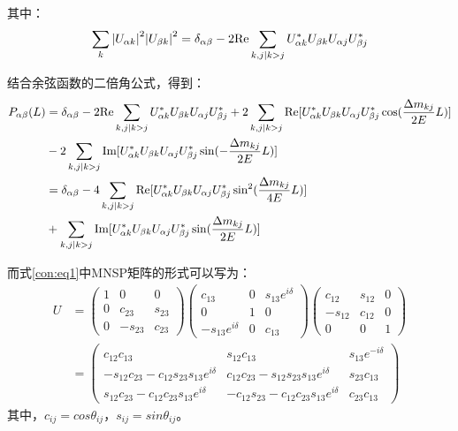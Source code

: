 \documentclass[10pt,a4paper]{article}
\begin{document}
其中：\begin{equation}
\label{con:eq17}
\sum_{k}{|U_{\alpha k}|}^{2}{|U_{\beta k}|}^{2}=\delta_{\alpha\beta}-2{\rm Re}\sum_{k,j |k>j}U_{\alpha k}^{*}U_{\beta k}U_{\alpha j}U_{\beta j}^{*}
\end{equation}


结合余弦函数的二倍角公式，得到：
\begin{equation}
\label{con:eq18}
\begin{split}
P_{\alpha\beta}(L)&=\delta_{\alpha\beta}-2{\rm Re}\sum_{k,j |k>j}U_{\alpha k}^{*}U_{\beta k}U_{\alpha j}U_{\beta j}^{*}+2\sum_{k,j |k>j}{\rm Re}[U_{\alpha k}^{*}U_{\beta k}U_{\alpha j}U_{\beta j}^{*}\cos(\frac{\Delta m_{kj}}{2E}L)]\\&-2\sum_{k,j |k>j}{\rm Im}[U_{\alpha k}^{*}U_{\beta k}U_{\alpha j}U_{\beta j}^{*}\sin(-\frac{\Delta m_{kj}}{2E}L)]
\\
&=\delta_{\alpha\beta}-4\sum_{k,j |k>j}{\rm Re}[U_{\alpha k}^{*}U_{\beta k}U_{\alpha j}U_{\beta j}^{*}\sin^2(\frac{\Delta m_{kj}}{4E}L)]
\\&+\sum_{k,j |k>j}{\rm Im}[U_{\alpha k}^{*}U_{\beta k}U_{\alpha j}U_{\beta j}^{*}\sin(\frac{\Delta m_{kj}}{2E}L)]
\end{split}
\end{equation}


而式\eqref{con:eq1}中MNSP矩阵的形式可以写为：
\begin{equation}
\label{con:eq19}
\begin{aligned}
U &= \begin{pmatrix}
 1 & 0 & 0 \\
 0 & c_{23} & s_{23} \\
 0 & -s_{23} & c_{23}
 \end{pmatrix}
 \begin{pmatrix}
 c_{13} & 0 & s_{13}e^{i\delta} \\
 0 & 1 & 0 \\
 -s_{13}e^{i\delta} & 0 & c_{13}
 \end{pmatrix} 
 \begin{pmatrix}
 c_{12} & s_{12} & 0 \\
 -s_{12} & c_{12} & 0 \\
 0 & 0 & 1
 \end{pmatrix}
 \\&=
 \begin{pmatrix}
 c_{12}c_{13} & s_{12}c_{13} & s_{13}e^{-i \delta} \\
 -s_{12}c_{23}-c_{12}s_{23}s_{13}e^{i\delta} & c_{12}c_{23}-s_{12}s_{23}s_{13}e^{i\delta} & s_{23}c_{13} \\
 s_{12}c_{23}-c_{12}c_{23}s_{13}e^{i\delta} &-c_{12}s_{23}-c_{12}c_{23}s_{13}e^{i\delta} & c_{23}c_{13}
 \end{pmatrix}
 \end{aligned}
\end{equation}
其中，$c_{ij}=cos\theta_{ij}，s_{ij}=sin\theta_{ij}$。
\end{document}

